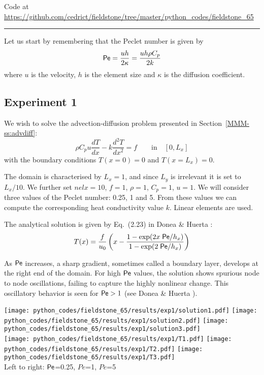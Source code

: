 

\begin{center}
Code at \url{https://github.com/cedrict/fieldstone/tree/master/python_codes/fieldstone_65}
\end{center}

\par\noindent\rule{\textwidth}{0.4pt}

Let us start by remembering that the Peclet number is given by 
\[
{\mathsf{Pe}} = \frac{uh}{2\kappa} = \frac{uh\rho C_p}{2 k}
\]
where $u$ is the velocity, $h$ is the element size and $\kappa$ is the diffusion coefficient.

\subsection*{Experiment 1}
We wish to solve the advection-diffusion problem presented in 
Section~\ref{MMM-ss:advdiff}:
\begin{equation}
\rho C_p u \frac{dT}{dx} - k \frac{d^2T}{dx^2} = f \qquad \text{in} \quad [0,L_x]
\end{equation}
with the boundary conditions $T(x=0)=0$ and $T(x=L_x)=0$.

The domain is characterised by $L_x=1$, and since $L_y$ is irrelevant it is set to $L_x/10$.
We further set $nelx=10$, $f=1$, $\rho=1$, $C_p=1$, $u=1$.
We will consider three values of the Peclet number: 0.25, 1 and 5.
From these values we can compute the corresponding heat conductivity value $k$.
Linear elements are used.

The analytical solution is given by Eq.~(2.23) in Donea \& Huerta \cite{dohu03}:
\[
T(x)= \frac{f}{u_0} \left(  x - \frac{1-\exp(2x \; {\mathsf{Pe}} /h_x)}{1-\exp(2\; {\mathsf{Pe}} / h_x)} \right) 
\]

As ${\mathsf{Pe}}$ increases, a sharp gradient, sometimes called a boundary layer,
develops at the right end of the domain. For high ${\mathsf{Pe}}$ values, the solution shows 
spurious node to node oscillations, failing to capture the highly nonlinear change. This oscillatory
behavior is seen for ${\mathsf{Pe}}>1$ (see Donea \& Huerta \cite{dohu03}).

\begin{center}
\texttt{[image: python\_codes/fieldstone\_65/results/exp1/solution1.pdf]}
\texttt{[image: python\_codes/fieldstone\_65/results/exp1/solution2.pdf]}
\texttt{[image: python\_codes/fieldstone\_65/results/exp1/solution3.pdf]}\\
\texttt{[image: python\_codes/fieldstone\_65/results/exp1/T1.pdf]}
\texttt{[image: python\_codes/fieldstone\_65/results/exp1/T2.pdf]}
\texttt{[image: python\_codes/fieldstone\_65/results/exp1/T3.pdf]}\\
{\captionfont Left to right: ${\mathsf{Pe}}$=0.25, $Pe$=1, $Pe$=5}
\end{center}

